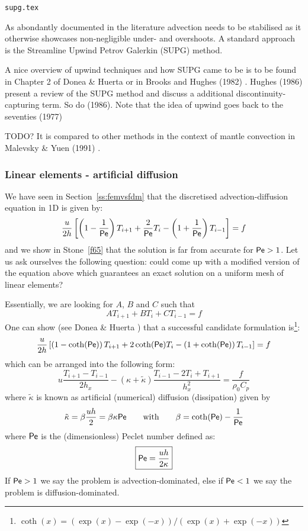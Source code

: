 \begin{flushright} {\tiny {\color{gray} \tt supg.tex}} \end{flushright}

As abondantly documented in the literature advection needs to be stabilised
as it otherwise showcases non-negligible under- and overshoots.
A standard approach is the Streamline Upwind Petrov Galerkin (SUPG) method.

A nice overview of upwind techniques and how SUPG came to be is to be found in Chapter 
2 of Donea \& Huerta \cite{dohu03} or in Brooks and Hughes (1982) \cite{brhu82}.
Hughes \etal (1986) \cite{humm86} present a review of the SUPG method 
and discuss a additional discontinuity-capturing term. 
So do \textcite{tepa86} (1986).
Note that the idea of upwind goes back to the seventies \textcite{hehz77} (1977)

TODO? It is compared to other methods in the context of mantle convection in 
Malevsky \& Yuen (1991) \cite{mayu91}. 

\subsubsection{Linear elements - artificial diffusion}

We have seen in Section~\ref{ss:femvsfdm} that the discretised advection-diffusion equation 
in 1D is given by:
\[
\frac{u}{2h}
\left[
\left(1-\frac{1}{{\mathsf{Pe}}}\right) T_{i+1} + \frac{2}{{\mathsf{Pe}}} T_i - \left(1+\frac{1}{{\mathsf{Pe}}}\right)T_{i-1} 
\right] = f
\]
and we show in Stone~\ref{f65} that the solution is far from accurate for ${\mathsf{Pe}}>1$. Let us ask ourselves the 
following question: could come up with a modified version of the equation above which 
guarantees an exact solution on a uniform mesh of linear elements?

Essentially, we are looking for $A$, $B$ and $C$ such that 
\[
A T_{i+1} + BT_i + C T_{i-1} = f
\]
One can show (see Donea \& Huerta \cite{dohu03}) that a successful candidate formulation 
is\footnote{$\coth(x)=(\exp(x)-\exp(-x))/(\exp(x)+\exp(-x))$}:
\[
\frac{u}{2h}
\left[
\left(1-\coth({\mathsf{Pe}}) \right) T_{i+1} + 2 \coth({\mathsf{Pe}}) T_i - \left(1+\coth({\mathsf{Pe}})\right) T_{i-1} 
\right] = f
\]
which can be arranged into the following form:
\begin{equation}
u
\frac{T_{i+1}-T_{i-1}}{2h_x}
-
(\kappa+ \tilde{\kappa})
\frac{T_{i-1}-2T_i+T_{i+1}}{h_x^2}
= \frac{f}{\rho_0 C_p}
\end{equation}
where 
$\tilde{\kappa}$ is known as artificial (numerical) diffusion (dissipation) given by
\[
\tilde{\kappa}=\beta \frac{u h}{2} = \beta \kappa {\mathsf{Pe}}
\qquad
\text{with}
\qquad
\beta = \coth ({\mathsf{Pe}}) - \frac{1}{{\mathsf{Pe}}}
\]
where ${\mathsf{Pe}}$ is the (dimensionless) Peclet number defined as: 
\[
\boxed{
{\mathsf{Pe}}= \frac{u h }{2 \kappa}
}
\]
If ${\mathsf{Pe}}>1$ we say the problem is advection-dominated, 
else if ${\mathsf{Pe}}<1$ we say the problem is diffusion-dominated.

